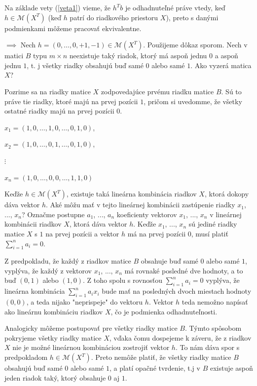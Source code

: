 \begin{dokaz}
Na základe vety (\ref{veta1}) vieme, že $h^T b$ je odhadnuteľné práve vtedy, keď $h \in \mathcal{M}(X^T)$
(keď $h$ patrí do riadkového priestoru $X$),
preto s danými podmienkami môžeme pracovať ekvivalentne.

$\boxed{\implies}$ Nech $h = (0, \ldots, 0, +1, -1) \in \mathcal{M}(X^T)$. Použijeme dôkaz sporom. 
Nech v matici $B$ typu $m \times n$ neexistuje taký riadok, ktorý má aspoň jednu $0$ a aspoň jednu $1$,
t. j všetky riadky obsahujú buď samé $0$ alebo samé $1$.
Ako vyzerá matica $X$?

Pozrime sa na riadky matice $X$ zodpovedajúce prvému riadku matice $B$.
Sú to práve tie riadky, ktoré majú na prvej pozícii $1$, pričom si uvedomme, že všetky ostatné riadky majú na prvej pozícii $0$.

\begin{center}
$
x_1 = (1, 0, \ldots, 1, 0, \ldots, 0, 1, 0)
$,
\end{center}
\begin{center}
$
x_2 = (1, 0, \ldots, 0, 1, \ldots, 0, 1, 0)
$,
\end{center}
\begin{center}
$\vdots$
\end{center}
\begin{center}
$
x_n = (1, 0, \ldots, 0, 0, \ldots, 1, 1, 0)
$
\end{center}

Keďže $h \in \mathcal{M}(X^T)$, existuje taká lineárna kombinácia riadkov $X$, ktorá dokopy dáva vektor $h$.
Aké môžu mať v tejto lineárnej kombinácii zastúpenie riadky $x_1$, ..., $x_n$?
Označme postupne $a_1$, ..., $a_n$ koeficienty vektorov $x_1$, ..., $x_n$ v lineárnej kombinácii riadkov $X$, ktorá dáva vektor $h$.
Keďže $x_1$, ..., $x_n$ sú jediné riadky matice $X$ s $1$ na prvej pozícii a vektor $h$ má na prvej pozícii $0$,
musí platiť $\sum_{i = 1}^n a_i = 0$.

Z predpokladu, že každý z riadkov matice $B$ obsahuje buď samé $0$ alebo samé $1$, vyplýva,
že každý z vektorov $x_1$, ..., $x_n$ má rovnaké posledné dve hodnoty, a to buď $(0, 1)$ alebo $(1, 0)$.
Z toho spolu s rovnosťou $\sum_{i = 1}^n a_i = 0$ vyplýva, že lineárna kombinácia $\sum_{i = 1}^n a_i x_i$
bude mať na posledných dvoch miestach hodnoty $(0, 0)$, a teda nijako "neprispeje" do vektoru $h$.
Vektor $h$ teda nemožno napísať ako lineárnu kombináciu riadkov $X$, čo je podmienka odhadnuteľnosti.

Analogicky môžeme postupovať pre všetky riadky matice $B$.
Týmto spôsobom pokryjeme všetky riadky matice $X$, vďaka čomu dospejeme k záveru,
že z riadkov $X$ nie je možné lineárnou kombináciou zostrojiť vektor $h$.
To nám dáva spor s predpokladom $h \in \mathcal{M}(X^T)$.
Preto nemôže platiť, že všetky riadky matice $B$ obsahujú buď samé $0$ alebo samé $1$,
a platí opačné tvrdenie, t.j v $B$ existuje aspoň jeden riadok taký, ktorý obsahuje $0$ aj $1$.


\end{dokaz}
